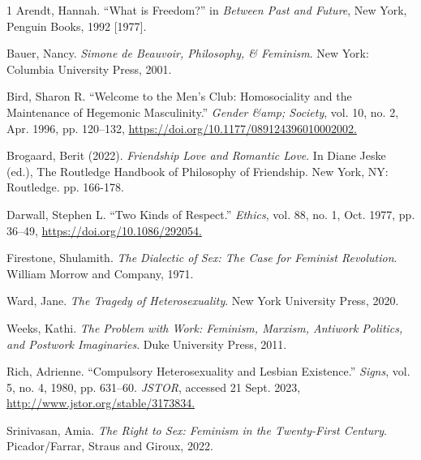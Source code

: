 
\begin{hangparas}{\hangingindent}{1}
Arendt, Hannah. ``What is Freedom?'' in \emph{Between Past and Future},
New York, Penguin Books, 1992 [1977].

Bauer, Nancy. \emph{Simone de Beauvoir, Philosophy, \& Feminism}. New
York: Columbia University Press, 2001.

Bird, Sharon R. ``Welcome to the Men's Club: Homosociality and the
Maintenance of Hegemonic Masculinity.'' \emph{Gender \&amp; Society}, vol. 10, no. 2, Apr. 1996, pp. 120--132,
\newline
\url{https://doi.org/10.1177/089124396010002002.}

Brogaard, Berit (2022). \emph{Friendship Love and Romantic Love}. In
Diane Jeske (ed.), The Routledge Handbook of Philosophy of Friendship. New York, NY: Routledge. pp. 166-178.

Darwall, Stephen L. ``Two Kinds of Respect.'' \emph{Ethics}, vol. 88,
no. 1, Oct. 1977, pp. 36--49,
\newline
\url{https://doi.org/10.1086/292054.}

Firestone, Shulamith. \emph{The Dialectic of Sex: The Case for Feminist
Revolution}. William Morrow and Company, 1971.

Ward, Jane. \emph{The Tragedy of Heterosexuality}. New York University
Press, 2020.

Weeks, Kathi. \emph{The Problem with Work: Feminism, Marxism, Antiwork
Politics, and Postwork Imaginaries}. Duke University Press, 2011.

Rich, Adrienne. ``Compulsory Heterosexuality and Lesbian Existence.''
\emph{Signs}, vol. 5, no. 4, 1980, pp. 631--60. \emph{JSTOR}, accessed 21 Sept. 2023,
\newline
\url{http://www.jstor.org/stable/3173834.} 

Srinivasan, Amia. \emph{The Right to Sex: Feminism in the Twenty-First
Century}. Picador/Farrar, Straus and Giroux, 2022.
\end{hangparas}
